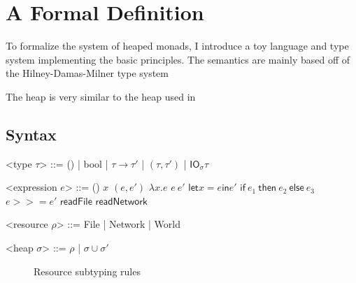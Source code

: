 \chapter{A Formal Definition}

To formalize the system of heaped monads, I introduce a toy language
and type system implementing the basic principles. The semantics are
mainly based off of the Hilney-Damas-Milner type system \cite{damasmilner}

The heap is very similar to the heap used in \cite{krishnaswami}

\section{Syntax}

\newcommand{\IO}{\mathsf{IO}}
\newcommand{\bind}{>\!\!>\!\!=} \newcommand{\concbind}{>\!\!>\!>\!\!=}
\newcommand{\subtyp}{\geq:}

\setlength{\grammarparsep}{20pt plus 1pt minus 1pt} %
\setlength{\grammarindent}{12em} %
\renewcommand{\syntleft}{}
\renewcommand{\syntright}{}


\def\defaultHypSeparation{\hskip .05in}

\begin{grammar}

<type $\tau$> ::= () | bool | $\tau \rightarrow \tau'$ | $(\tau, \tau')$ | $\textsf{IO}_\sigma \tau$

<expression $e$> ::= ()
\alt $x$
\alt $(e, e')$
\alt $\lambda x . e$
\alt $e \ e'$
\alt $\textsf{let} x = e \textsf{in} e'$ 
\alt $\textsf{if} \ e_1 \ \textsf{then} \ e_2 \ \textsf{else} \ e_3$
\alt $e \bind e'$
\alt $\textsf{readFile}$
\alt $\textsf{readNetwork}$

<resource $\rho$> ::= \textsf{File} | \textsf{Network} | \textsf{World}

<heap $\sigma$> ::= $\rho$ | $\sigma \cup \sigma'$

\end{grammar}

\begin{figure}

  \caption{Resource subtyping rules}
\end{figure}


